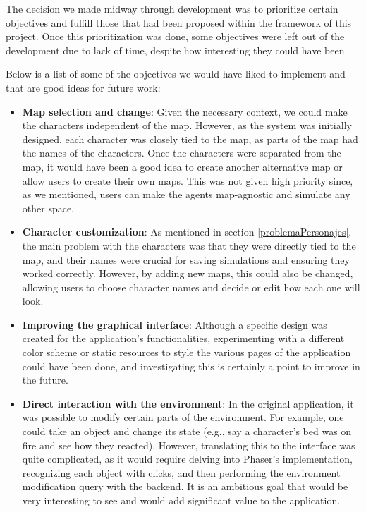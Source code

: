 The decision we made midway through development was to prioritize certain objectives and fulfill those that had been proposed within the framework of this project. Once this prioritization was done, some objectives were left out of the development due to lack of time, despite how interesting they could have been.

Below is a list of some of the objectives we would have liked to implement and that are good ideas for future work:

\begin{itemize}
	\item \textbf{Map selection and change}: Given the necessary context, we could make the characters independent of the map. However, as the system was initially designed, each character was closely tied to the map, as parts of the map had the names of the characters. Once the characters were separated from the map, it would have been a good idea to create another alternative map or allow users to create their own maps. This was not given high priority since, as we mentioned, users can make the agents map-agnostic and simulate any other space.
	
	\item \textbf{Character customization}: As mentioned in section \ref{problemaPersonajes}, the main problem with the characters was that they were directly tied to the map, and their names were crucial for saving simulations and ensuring they worked correctly. However, by adding new maps, this could also be changed, allowing users to choose character names and decide or edit how each one will look.
	
	\item \textbf{Improving the graphical interface}: Although a specific design was created for the application's functionalities, experimenting with a different color scheme or static resources to style the various pages of the application could have been done, and investigating this is certainly a point to improve in the future.
	
	\item \textbf{Direct interaction with the environment}: In the original application, it was possible to modify certain parts of the environment. For example, one could take an object and change its state (e.g., say a character's bed was on fire and see how they reacted). However, translating this to the interface was quite complicated, as it would require delving into Phaser's implementation, recognizing each object with clicks, and then performing the environment modification query with the backend. It is an ambitious goal that would be very interesting to see and would add significant value to the application.
	

\end{itemize}

